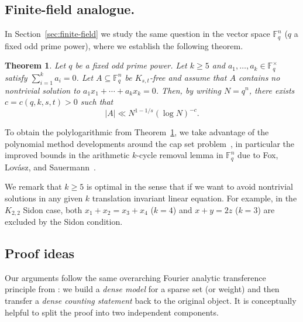 \documentclass[A4paper,reqno,oneside,12pt]{amsart}
\theoremstyle{plain}
\newtheorem{theorem}{Theorem}[section]
\theoremstyle{definition}
\newcommand{\F}{\mathbb{F}}
\begin{document}
\medskip

\subsection*{Finite-field analogue.}
In Section~\ref{sec:finite-field} we study the same question in the vector space $\F_q^n$
($q$ a fixed odd prime power), where we establish the following theorem. 

\begin{theorem}\label{JPX2}
Let $q$ be a fixed odd prime power.  Let $k\ge 5$ and $a_1,\dots,a_k\in\F_q^\times$ satisfy $\sum_{i=1}^k a_i=0$.
Let $A\subseteq \F_q^n$ be $K_{s,t}$-free and assume that $A$ contains no nontrivial solution to
$a_1x_1+\cdots+a_kx_k=0$.  Then, by writing $N=q^n$, there exists $c=c(q,k,s,t)>0$ such that
\[
|A|\ll N^{1-1/s}(\log N)^{-c}.
\]
\end{theorem}

To obtain the polylogarithmic from Theorem~\ref{JPX2}, we take advantage of the polynomial method developments around the cap set problem~\cite{CLP17,EG}, in particular the improved bounds in the arithmetic $k$-cycle removal lemma in $\mathbb{F}_{q}^{n}$ due to Fox, Lov\'asz, and Sauermann~\cite{FLS}.


We remark that $k\ge 5$ is optimal in the sense that if we want to avoid nontrivial solutions in any given $k$ translation invariant linear equation. For example, in the $K_{2,2}$ Sidon case, both $x_1+x_2=x_3+x_4$ ($k=4$) and $x+y=2z$ ($k=3$) are excluded by the Sidon condition.


\medskip
\subsection*{Proof ideas}\label{subsec:proof-ideas}

Our arguments follow the same overarching Fourier analytic transference principle from \cite{Prendi}: we build a \emph{dense model} for a sparse set (or weight) and then transfer a \emph{dense counting statement} back to the original object.  It is conceptually helpful to split the proof into two independent components.
\end{document}
